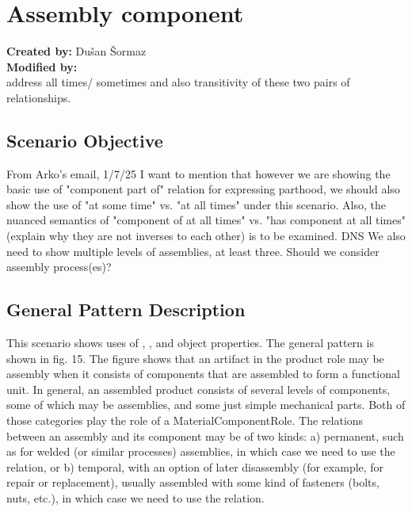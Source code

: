 \section{Assembly component}

\textbf{Created by:} Dušan Šormaz \\
\textbf{Modified by:}  \\

address all times/ sometimes and also transitivity of these two pairs of relationships.

\subsection*{Scenario Objective}
From Arko's email, 1/7/25 
I want to mention that however we are showing the basic use of "component part of" relation for expressing parthood, we should also show the use of "at some time" vs. "at all times" under this scenario. Also, the nuanced semantics of "component of at all times" vs. "has component at all times" (explain why they are not inverses to each other) is to be examined.
DNS
We also need to show multiple levels of assemblies, at least three. Should we consider assembly process(es)? 


\subsection*{General Pattern Description}

\sloppy This scenario shows uses of , , and  object properties. The general pattern is shown in fig. 15. The figure shows that an artifact in the product role may be assembly when it consists of components that are assembled to form a functional unit. In general, an assembled product consists of several levels of components, some of which may be assemblies, and some just simple mechanical parts. Both of those categories play the role of a MaterialComponentRole. The relations between an assembly and its component may be of two kinds: a) permanent, such as for welded (or similar processes) assemblies, in which case we need to use the  relation, or b) temporal, with an option of later disassembly (for example, for repair or replacement), usually assembled with some  kind of fasteners (bolts, nuts, etc.), in which case we need to use the  relation.

